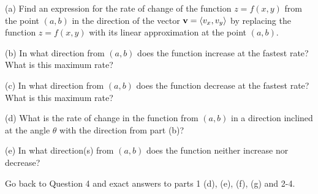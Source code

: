 \documentclass{ximera}
\begin{document}
\begin{question}  \label{Qedf4t5t}
(a) Find an expression for the rate of change of the function $z=f(x,y)$ from the point $(a,b)$ in the direction of the vector ${\bf v} = \langle v_x, v_y \rangle$ by replacing the function $z=f(x,y)$ with its linear approximation at the point $(a,b)$.

(b) In what direction from $(a,b)$ does the function increase at the fastest rate? What is this maximum rate?

(c) In what direction from $(a,b)$ does the function decrease at the fastest rate? What is this maximum rate?

(d) What is the rate of change in the function from $(a,b)$ in a direction inclined at the angle $\theta$ with the direction from part (b)?

(e)  In what direction(s) from $(a,b)$ does the function neither increase nor decrease?

\end{question}

\begin{question}  \label{Qdef67kk}
Go back to Question 4 and exact answers to parts 1 (d), (e), (f), (g) and 2-4.

\end{question}
\end{document}
